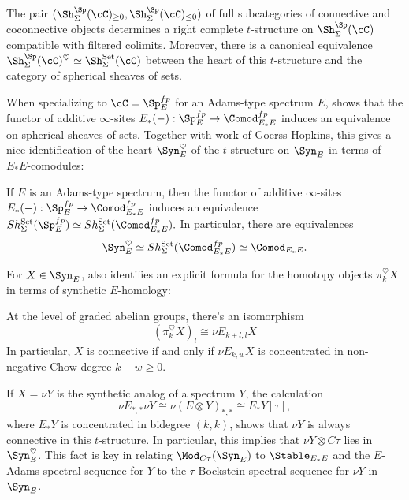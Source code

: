   \begin{proposition}
  \label{general_sheaf_tstruct_prop}
  The pair $(\Sh_{\Sigma}^{\Sp}(\cC)_{\geq 0},\Sh_{\Sigma}^{\Sp}(\cC)_{\leq 0})$ of full subcategories of connective and coconnective objects determines a right
  complete $t$-structure on $\Sh_{\Sigma}^{\Sp}(\cC)$ compatible with filtered colimits. Moreover, there is a canonical equivalence $\Sh_{\Sigma}^{\Sp}(\cC)^\heartsuit\simeq \Sh_{\Sigma}^{\mathrm{Set}}(\cC)$ between the heart of this $t$-structure and the category of
  spherical sheaves of sets.
  \end{proposition}
  
  When specializing to $\cC=\Sp_E^{fp}$ for an Adams-type spectrum $E$, \cite{Pst22} shows that the functor of additive $\infty$-sites $E_*(-):\Sp_E^{fp}\to\Comod_{E_*E}^{fp}$ induces an equivalence on spherical sheaves of sets. Together with work of Goerss-Hopkins, this gives a nice identification of the heart $\Syn_E^\heartsuit$ of the $t$-structure on $\Syn_E$ in terms of $E_*E$-comodules:
  
  \begin{theorem}
  If $E$ is an Adams-type spectrum, then the functor of additive $\infty$-sites $E_*(-):\Sp_E^{fp}\to\Comod_{E_*E}^{fp}$ induces an equivalence $Sh_{\Sigma}^{\mathrm{Set}}(\Sp_E^{fp})\simeq Sh_{\Sigma}^{\mathrm{Set}}(\Comod_{E_*E}^{fp}).$
  In particular, there are equivalences
  $$
  \Syn_E^{\heartsuit}\simeq Sh_{\Sigma}^{\mathrm{Set}}(\Comod_{E_*E}^{fp})\simeq \Comod_{E_*E}.
  $$
  \end{theorem}
  
  For $X\in\Syn_E$, \cite{Pst22} also identifies an explicit formula for the homotopy objects $\pi_k^\heartsuit X$ in terms of synthetic $E$-homology:
  
  \begin{theorem}
  \label{SynE_homology_tstruct}
      At the level of graded abelian groups, there's an isomorphism
  $$
  (\pi_k^\heartsuit X)_l\cong \nu E_{k+l,l}X
  $$
  In particular, $X$ is connective if and only if $\nu E_{k,w}X$ is concentrated in non-negative Chow degree $k-w\geq 0$.
  \end{theorem}
  
  If $X=\nu Y$ is the synthetic analog of a spectrum $Y$, the calculation
  $$
  \nu E_{*,*}\nu Y\cong \nu (E\otimes Y)_{*,*}\cong E_*Y[\tau],
  $$
  where $E_*Y$ is concentrated in bidegree $(k,k)$, shows that $\nu Y$ is always connective in this $t$-structure. In particular, this implies that $\nu Y\otimes C\tau$ lies in $\Syn_E^\heartsuit$. This fact is key in relating $\Mod_{C\tau}(\Syn_E)$ to $\Stable_{E_*E}$ and the $E$-Adams spectral sequence for $Y$ to the $\tau$-Bockstein spectral sequence for $\nu Y$ in $\Syn_E$.
  
